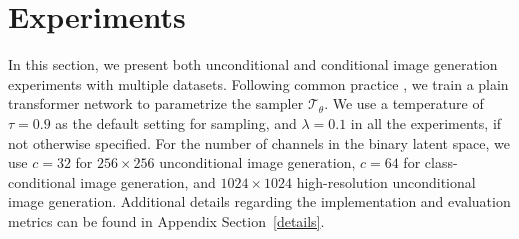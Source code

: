 \documentclass[10pt,twocolumn,letterpaper]{article}
\begin{document}
\section{Experiments}
\label{exp}
In this section, we present both unconditional and conditional image generation experiments with multiple datasets.
Following common practice \cite{maskgit,unleashing}, we train a plain transformer network \cite{atten} to parametrize the sampler $\mathcal{T}_\theta$. We use a temperature of $\tau = 0.9$ as the default setting for sampling, and $\lambda = 0.1$ in all the experiments, if not otherwise specified. 
For the number of channels in the binary latent space, we use $c = 32$ for $256 \times 256$ unconditional image generation, $c = 64$ for class-conditional image generation, and $1024 \times 1024$ high-resolution unconditional image generation.
Additional details regarding the implementation and evaluation metrics can be found in Appendix Section~\ref{details}.







\end{document}
